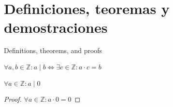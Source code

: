 \documentclass[11pt, aspectratio=169]{beamer}
\begin{document}
\section{Definiciones, teoremas y demostraciones}

\begin{frame}{Definitions, theorems, and proofs}   
	\begin{definition}
		$\forall a,b\in\mathds{Z}: a\mid b\iff\exists c\in\mathds{Z}:a\cdot c=b$
	\end{definition}
	\begin{theorem}
		$\forall a\in\mathds{Z}: a\mid 0$
	\end{theorem}
	\begin{proof}
		$\forall a\in\mathds{Z}: a\cdot 0=0$
	\end{proof}
\end{frame}

\end{document}
